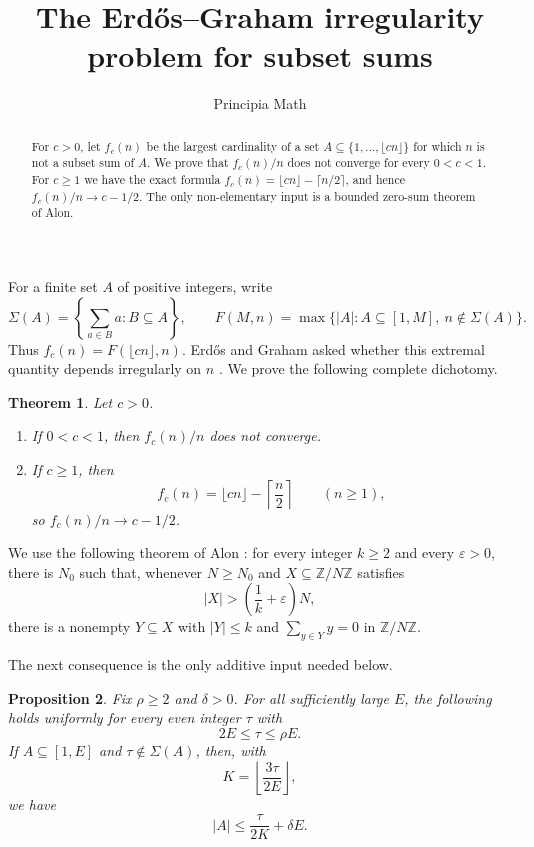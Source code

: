 \documentclass[11pt,reqno]{amsart}
\title{The Erd\H{o}s--Graham irregularity problem for subset sums}
\author{Principia Math}
\date{}
\newtheorem{theorem}{Theorem}
\newtheorem{proposition}[theorem]{Proposition}
\newcommand{\Z}{\mathbb Z}
\newcommand{\card}[1]{\lvert #1\rvert}
\begin{document}
\begin{abstract}
For $c>0$, let $f_c(n)$ be the largest cardinality of a set
$A\subseteq\{1,\ldots,\lfloor cn\rfloor\}$ for which $n$ is not a subset sum of $A$.
We prove that $f_c(n)/n$ does not converge for every $0<c<1$.  For $c\geq1$ we have the exact formula
$f_c(n)=\lfloor cn\rfloor-\lceil n/2\rceil$, and hence $f_c(n)/n\to c-1/2$.
The only non-elementary input is a bounded zero-sum theorem of Alon.
\end{abstract}

\maketitle

For a finite set $A$ of positive integers, write
\[
 \Sigma(A)=\left\{\sum_{a\in B}a:B\subseteq A\right\},
 \qquad
 F(M,n)=\max\{\card A:A\subseteq[1,M],\ n\notin\Sigma(A)\}.
\]
Thus $f_c(n)=F(\lfloor cn\rfloor,n)$.  Erd\H{o}s and Graham asked whether this extremal quantity depends irregularly on $n$ \cite[p.~59]{EG}.  We prove the following complete dichotomy.

\begin{theorem}\label{thm:main}
Let $c>0$.
\begin{enumerate}
\item If $0<c<1$, then $f_c(n)/n$ does not converge.
\item If $c\geq1$, then
\[
 f_c(n)=\lfloor cn\rfloor-\left\lceil\frac n2\right\rceil
 \qquad(n\geq1),
\]
so $f_c(n)/n\to c-1/2$.
\end{enumerate}
\end{theorem}

We use the following theorem of Alon \cite[Theorem~1.1]{Alon}: for every integer $k\geq2$ and every $\varepsilon>0$, there is $N_0$ such that, whenever $N\geq N_0$ and $X\subseteq\Z/N\Z$ satisfies
\[
 \card X>\left(\frac1k+\varepsilon\right)N,
\]
there is a nonempty $Y\subseteq X$ with $\card Y\leq k$ and $\sum_{y\in Y}y=0$ in $\Z/N\Z$.

The next consequence is the only additive input needed below.

\begin{proposition}\label{prop:bound}
Fix $\rho\geq2$ and $\delta>0$.  For all sufficiently large $E$, the following holds uniformly for every even integer $\tau$ with
\[
 2E\leq\tau\leq\rho E.
\]
If $A\subseteq[1,E]$ and $\tau\notin\Sigma(A)$, then, with
\[
 K=\left\lfloor\frac{3\tau}{2E}\right\rfloor,
\]
we have
\[
 \card A\leq \frac{\tau}{2K}+\delta E.
\]
\end{proposition}
\end{document}
